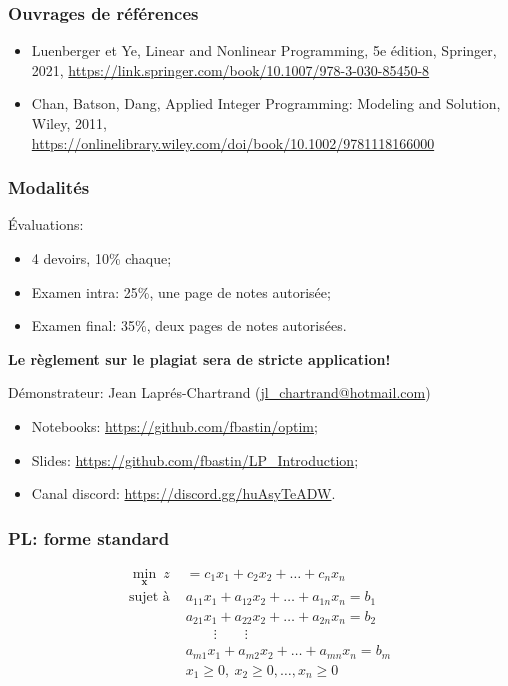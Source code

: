\documentclass[usepdftitle=false]{beamer}
\def\bx{\boldsymbol{x}}
\begin{document}
\begin{frame}
\frametitle{Ouvrages de références}

\begin{itemize}
	\item
	Luenberger et Ye, Linear and Nonlinear Programming, 5e édition, Springer, 2021, \url{https://link.springer.com/book/10.1007/978-3-030-85450-8}
	\item
	Chan, Batson, Dang, Applied Integer Programming: Modeling and Solution, Wiley, 2011,
	\url{https://onlinelibrary.wiley.com/doi/book/10.1002/9781118166000}
\end{itemize}

\end{frame}

\begin{frame}
\frametitle{Modalités}

Évaluations:
\begin{itemize}
	\item 4 devoirs, 10\% chaque;
	\item Examen intra: 25\%, une page de notes autorisée;
	\item Examen final: 35\%, deux pages de notes autorisées.
\end{itemize}
{\bf Le règlement sur le plagiat sera de stricte application!}

\mbox{}

Démonstrateur: Jean Laprés-Chartrand (\url{jl_chartrand@hotmail.com})\\

\mbox{}

\begin{itemize}
	\item 
Notebooks: \url{https://github.com/fbastin/optim};
\item
Slides: \url{https://github.com/fbastin/LP_Introduction};
\item
Canal discord: \url{https://discord.gg/huAsyTeADW}.
\end{itemize}

\end{frame}

\begin{frame}
\frametitle{PL: forme standard}

\begin{align*}
\min_{\bx}\ z &= c_1x_1+c_2x_2+\ldots +c_nx_n \\
\mbox{sujet à } &
a_{11}x_1 + a_{12}x_2 + \ldots + a_{1n}x_n = b_1 \\
&a_{21}x_1 + a_{22}x_2 + \ldots + a_{2n}x_n = b_2 \\
& \qquad \vdots \qquad \vdots \\
& a_{m1}x_1 + a_{m2}x_2 + \ldots + a_{mn}x_n = b_m \\
& x_1 \geq 0,\ x_2 \geq 0, \ldots, x_n \geq 0 \\
\end{align*}

\mbox{}
\end{frame}
\end{document}
